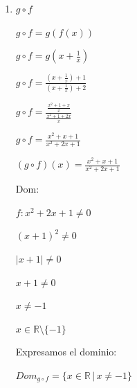 \documentclass{article}
\begin{document}
\begin{enumerate}
\begin{enumerate}
\begin{enumerate}
                \( x+1 \neq 0 \land x+2 \neq 0 \)
                
                \( x \neq -1 \land x \neq -2 \)
                
                \( x \in \mathbb{R} \setminus \{-2, -1\} \)
                \vspace{\baselineskip}
                
                \(Dom_{f \circ g} = \{x \in \mathbb{R} \, | \, x \neq -2 \land x \neq -1\} \)
                
                \(Dom_{f \circ g} = \mathbb{R} \setminus \{-2, -1\} \)
                
                \item[2.] \(g \circ f\)

                \( g \circ f = g(f(x)) \)
                
                \( g \circ f = g\left(x + \frac{1}{x}\right) \)
                
                \( g \circ f = \frac{\left(x + \frac{1}{x}\right) + 1}{\left(x + \frac{1}{x}\right) + 2} \)
                
                \( g \circ f = \frac{\frac{x^2 + 1 + x}{x}}{\frac{x^2 + 1 + 2x}{x}} \)
                
                \( g \circ f = \frac{x^2 + x + 1}{x^2 + 2x + 1} \)
                \vspace{\baselineskip}

                \((g \circ f)(x) = \frac{x^2 + x + 1}{x^2 + 2x + 1}\)
                \vspace{\baselineskip}
                
                Dom:
                
                \(f: x^2 + 2x + 1 \neq 0 \)
                
                \( (x+1)^2 \neq 0 \)
                
                \( |x+1| \neq 0 \)
                
                \( x+1 \neq 0 \)
                
                \( x \neq -1 \)
                
                \( x \in \mathbb{R} \setminus \{-1\} \)
                \vspace{\baselineskip}

                Expresamos el dominio:
                
                \(Dom_{g \circ f} = \{x \in \mathbb{R} \, | \, x \neq -1\} \)
                

\end{enumerate}
\end{enumerate}
\end{enumerate}
\end{document}
